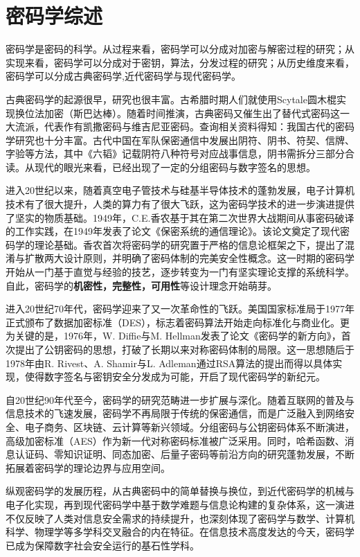 \documentclass[12pt]{ctexart}
\begin{document}
	\section{密码学综述}
		密码学是密码的科学。从过程来看，密码学可以分成对加密与解密过程的研究；从实现来看，密码学可以分成对于密钥，算法，分发过程的研究；从历史维度来看，密码学可以分成古典密码学,近代密码学与现代密码学。
		
		古典密码学的起源很早，研究也很丰富。古希腊时期人们就使用Scytale圆木棍实现换位法加密（斯巴达棒）。随着时间推演，古典密码又催生出了替代式密码这一大流派，代表作有凯撒密码与维吉尼亚密码。查询相关资料得知\cite{gudianmima}：我国古代的密码学研究也十分丰富。古代中国在军队保密通信中发展出阴符、阴书、符契、信牌、字验等方法，其中《六韬》记载阴符八种符号对应战事信息，阴书需拆分三部分合读。从现代的眼光来看，已经出现了一定的分组密码与数字签名的思想。
		
		进入20世纪以来，随着真空电子管技术与硅基半导体技术的蓬勃发展，电子计算机技术有了很大提升，人类的算力有了很大飞跃，这为密码学技术的进一步演进提供了坚实的物质基础。1949年，C.E.香农基于其在第二次世界大战期间从事密码破译的工作实践，在1949年发表了论文《保密系统的通信理论》。该论文奠定了现代密码学的理论基础。香农首次将密码学的研究置于严格的信息论框架之下，提出了混淆与扩散两大设计原则，并明确了密码体制的完美安全性概念。这一时期的密码学开始从一门基于直觉与经验的技艺，逐步转变为一门有坚实理论支撑的系统科学。自此，密码学的\textbf{机密性，完整性，可用性}等设计理念开始萌芽。
		
		进入20世纪70年代，密码学迎来了又一次革命性的飞跃。美国国家标准局于1977年正式颁布了数据加密标准（DES），标志着密码算法开始走向标准化与商业化。更为关键的是，1976年，W. Diffie与M. Hellman发表了论文《密码学的新方向》，首次提出了公钥密码的思想，打破了长期以来对称密码体制的局限。这一思想随后于1978年由R. Rivest、A. Shamir与L. Adleman通过RSA算法的提出而得以具体实现，使得数字签名与密钥安全分发成为可能，开启了现代密码学的新纪元。
		
		自20世纪90年代至今，密码学的研究范畴进一步扩展与深化。随着互联网的普及与信息技术的飞速发展，密码学不再局限于传统的保密通信，而是广泛融入到网络安全、电子商务、区块链、云计算等新兴领域。分组密码与公钥密码体系不断演进，高级加密标准（AES）作为新一代对称密码标准被广泛采用。同时，哈希函数、消息认证码\cite{krawczyk1997hmac}、零知识证明\cite{goldwasser1989knowledge}、同态加密\cite{gentry2009fully}、后量子密码\cite{zong2025mathematical}等前沿方向的研究蓬勃发展，不断拓展着密码学的理论边界与应用空间。
		
		纵观密码学的发展历程，从古典密码中的简单替换与换位，到近代密码学的机械与电子化实现，再到现代密码学中基于数学难题与信息论构建的复杂体系，这一演进不仅反映了人类对信息安全需求的持续提升，也深刻体现了密码学与数学、计算机科学、物理学等多学科交叉融合的内在特征。在信息技术高度发达的今天，密码学已成为保障数字社会安全运行的基石性学科。
\end{document}
